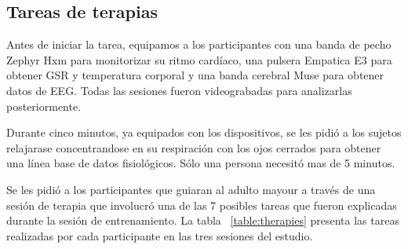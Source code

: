 \subsection{Tareas de terapias}\label{secc:therapytasks}
Antes de iniciar la tarea, equipamos a los participantes con una banda de pecho Zephyr Hxm para monitorizar su ritmo card\'iaco, una pulsera Empatica E3 para obtener GSR y temperatura corporal y una banda cerebral Muse para obtener datos de EEG. Todas las sesiones fueron videograbadas para analizarlas posteriormente.

Durante cinco minutos, ya equipados con los dispositivos, se les pidi\'o a los sujetos relajarase concentrandose en su respiraci\'on con los ojos cerrados para obtener una l\'inea base de datos fisiol\'ogicos. S\'olo una persona necesit\'o mas de 5 minutos.

Se les pidi\'o a los participantes que guiaran al adulto mayour a trav\'es de una sesi\'on de terapia que involucr\'o una de las 7 posibles tareas que fueron explicadas durante la sesi\'on de entrenamiento. La tabla ~\ref{table:therapies} presenta las tareas realizadas por cada participante en las tres sesiones del estudio.

